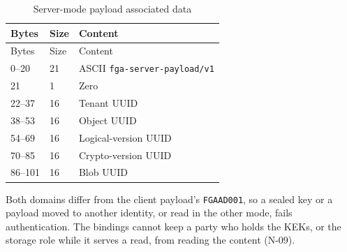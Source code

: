 \documentclass[11pt,a4paper]{article}
\newcommand{\code}[1]{{\small\nolinkurl{#1}}}
\begin{document}
\begin{longtable}{@{}P{0.15\textwidth}P{0.20\textwidth}P{0.55\textwidth}@{}}
\caption{Server-mode payload associated data}\label{tab:serveraad}\\
\toprule Bytes & Size & Content\\\midrule\endfirsthead
\toprule Bytes & Size & Content\\\midrule{}--20 & 21 & ASCII \code{fga-server-payload/v1}\\
21 & 1 & Zero\\
22--37 & 16 & Tenant UUID\\
38--53 & 16 & Object UUID\\
54--69 & 16 & Logical-version UUID\\
70--85 & 16 & Crypto-version UUID\\
86--101 & 16 & Blob UUID\\
\bottomrule
\end{longtable}

Both domains differ from the client payload's \code{FGAAD001}, so a sealed
key or a payload moved to another identity, or read in the other mode, fails
authentication. The bindings cannot keep a party who holds the KEKs, or the
storage role while it serves a read, from reading the content (N-09).
\end{document}
